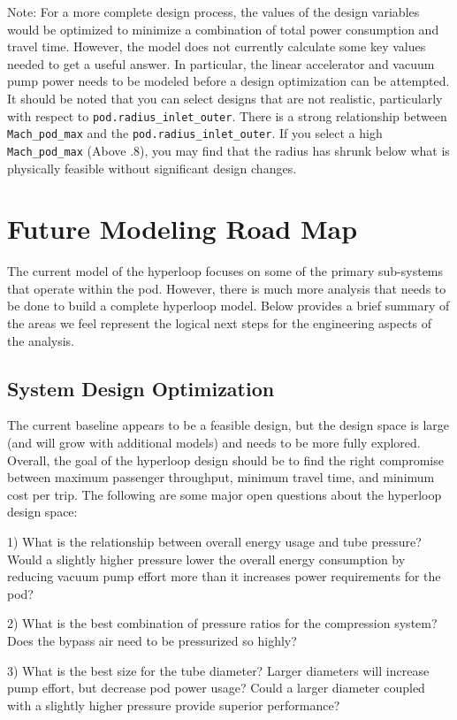 \documentclass[heading.tex]{subfiles}
\begin{document}
Note: For a more complete design process, the values of the design variables would be optimized to minimize a combination of total power
consumption and travel time. However, the model does not currently calculate some key values needed to get a useful answer. In particular,
the linear accelerator and vacuum pump power needs to be modeled before a design optimization can be attempted.
It should be noted that you can select designs that are not realistic, particularly with respect to \texttt{pod.radius\_inlet\_outer}. There is
a strong relationship between \texttt{Mach\_pod\_max} and the \texttt{pod.radius\_inlet\_outer}. If you select a high 
\texttt{Mach\_pod\_max} (Above .8), you may find that the radius has shrunk below what is physically feasible without significant design
changes.

\section{Future Modeling Road Map}
The current model of the hyperloop focuses on some of the primary sub-systems that operate within the pod. However, there is much more
analysis that needs to be done to build a complete hyperloop model. Below provides a brief summary of the areas we feel represent the
logical next steps for the engineering aspects of the analysis.

\subsection{System Design Optimization}
The current baseline appears to be a feasible design, but the design space is large (and will grow with additional models) and needs to be
more fully explored. Overall, the goal of the hyperloop design should be to find the right compromise between maximum passenger
throughput, minimum travel time, and minimum cost per trip. The following are some major open questions about the hyperloop design
space:

1) What is the relationship between overall energy usage and tube pressure? Would a slightly higher pressure lower the overall energy
consumption by reducing vacuum pump effort more than it increases power requirements for the pod?

2) What is the best combination of pressure ratios for the compression system? Does the bypass air need to be pressurized so highly?

3) What is the best size for the tube diameter? Larger diameters will increase pump effort, but decrease pod power usage? Could a larger
diameter coupled with a slightly higher pressure provide superior performance?
\end{document}
